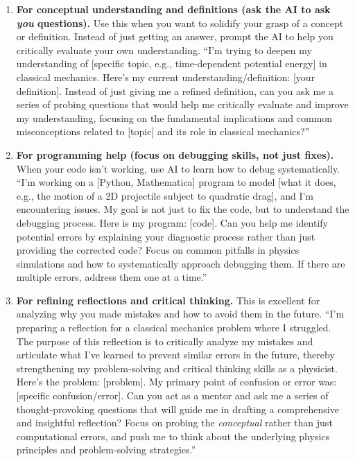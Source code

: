 \begin{enumerate}
\item \textbf{For conceptual understanding and definitions (ask the AI to
  ask \emph{you} questions).} Use this when you want to solidify your
  grasp of a concept or definition. Instead of just getting an answer,
  prompt the AI to help you critically evaluate your own understanding.
  ``I'm trying to deepen my understanding of [specific topic, e.g.,
  time-dependent potential energy] in classical mechanics. Here's my
  current understanding/definition: [your definition]. Instead of just
  giving me a refined definition, can you ask me a series of probing
  questions that would help me critically evaluate and improve my
  understanding, focusing on the fundamental implications and common
  misconceptions related to [topic] and its role in classical
  mechanics?''
\item \textbf{For programming help (focus on debugging skills, not just
  fixes).} When your code isn't working, use AI to learn how to debug
  systematically. ``I'm working on a [Python, Mathematica] program to
  model [what it does, e.g., the motion of a 2D projectile subject to
  quadratic drag], and I'm encountering issues. My goal is not just to
  fix the code, but to understand the debugging process. Here is my
  program: [code]. Can you help me identify potential errors by
  explaining your diagnostic process rather than just providing the
  corrected code? Focus on common pitfalls in physics simulations and
  how to systematically approach debugging them. If there are multiple
  errors, address them one at a time.''
\item \textbf{For refining reflections and critical thinking.} This is
  excellent for analyzing why you made mistakes and how to avoid them in
  the future. ``I'm preparing a reflection for a classical mechanics
  problem where I struggled. The purpose of this reflection is to
  critically analyze my mistakes and articulate what I've learned to
  prevent similar errors in the future, thereby strengthening my
  problem-solving and critical thinking skills as a physicist. Here's the
  problem: [problem]. My primary point of confusion or error was:
  [specific confusion/error]. Can you act as a mentor and ask me a series
  of thought-provoking questions that will guide me in drafting a
  comprehensive and insightful reflection? Focus on probing the
  \emph{conceptual} rather than just computational errors, and push me to
  think about the underlying physics principles and problem-solving
  strategies.''

\end{enumerate}
